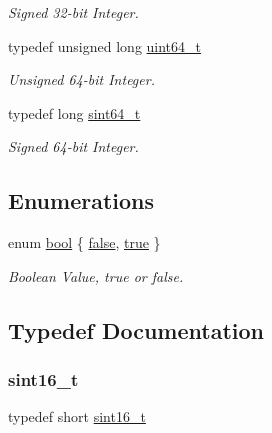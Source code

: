 \begin{DoxyCompactItemize}
\begin{DoxyCompactList}\small\item\em Signed 32-\/bit Integer. \end{DoxyCompactList}\item 
typedef unsigned long \hyperlink{a00023_aa232ecf786a74ce5363c36c10798d2b1_aa232ecf786a74ce5363c36c10798d2b1}{uint64\+\_\+t}
\begin{DoxyCompactList}\small\item\em Unsigned 64-\/bit Integer. \end{DoxyCompactList}\item 
typedef long \hyperlink{a00023_a04761b9e7480e1e48b0d392da17fd5d4_a04761b9e7480e1e48b0d392da17fd5d4}{sint64\+\_\+t}
\begin{DoxyCompactList}\small\item\em Signed 64-\/bit Integer. \end{DoxyCompactList}\end{DoxyCompactItemize}
\subsection*{Enumerations}
\begin{DoxyCompactItemize}
\item 
enum \hyperlink{a00023_af6a258d8f3ee5206d682d799316314b1_af6a258d8f3ee5206d682d799316314b1}{bool} \{ \hyperlink{a00023_af6a258d8f3ee5206d682d799316314b1_af6a258d8f3ee5206d682d799316314b1ae9de385ef6fe9bf3360d1038396b884c}{false}, 
\hyperlink{a00023_af6a258d8f3ee5206d682d799316314b1_af6a258d8f3ee5206d682d799316314b1a08f175a5505a10b9ed657defeb050e4b}{true}
 \}\begin{DoxyCompactList}\small\item\em Boolean Value, true or false. \end{DoxyCompactList}
\end{DoxyCompactItemize}


\subsection{Typedef Documentation}
\mbox{\label{a00023_a5881659ed80e940350d12831204375cd_a5881659ed80e940350d12831204375cd}} 
\subsubsection{\texorpdfstring{sint16\+\_\+t}{sint16\_t}}
{\footnotesize\ttfamily typedef short \hyperlink{a00023_a5881659ed80e940350d12831204375cd_a5881659ed80e940350d12831204375cd}{sint16\+\_\+t}}



